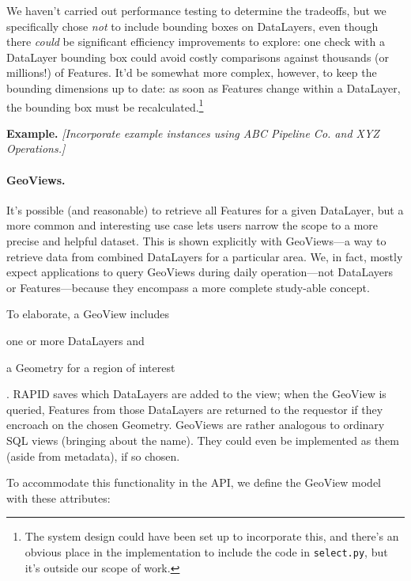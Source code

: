  We haven't carried out performance testing to determine the tradeoffs, but we specifically chose \textit{not} to include bounding boxes on DataLayers, even though there \textit{could} be significant efficiency improvements to explore: one check with a DataLayer bounding box could avoid costly comparisons against thousands (or millions!) of Features. It'd be somewhat more complex, however, to keep the bounding dimensions up to date: as soon as Features change within a DataLayer, the bounding box must be recalculated.\footnote{The system design could have been set up to incorporate this, and there's an obvious place in the implementation to include the code in \texttt{select.py}, but it's outside our scope of work.}
 
\textbf{Example.} \textit{[Incorporate example instances using ABC Pipeline Co. and XYZ Operations.]}

\paragraph{GeoViews.}
It's possible (and reasonable) to retrieve all Features for a given DataLayer, but a more common and interesting use case lets users narrow the scope to a more precise and helpful dataset. This is shown explicitly with GeoViews---a way to retrieve data from combined DataLayers for a particular area. We, in fact, mostly expect applications to query GeoViews during daily operation---not DataLayers or Features---because they encompass a more complete study-able concept.

To elaborate, a GeoView includes 
\begin{enumerate*}[label=\itshape\alph*\upshape)]
\item one or more DataLayers and
\item a Geometry for a region of interest
\end{enumerate*}. RAPID saves which DataLayers are added to the view; when the GeoView is queried, Features from those DataLayers are returned to the requestor if they encroach on the chosen Geometry. GeoViews are rather analogous to ordinary SQL views (bringing about the name). They could even be implemented as them (aside from metadata), if so chosen.

To accommodate this functionality in the API, we define the GeoView model with these attributes:

